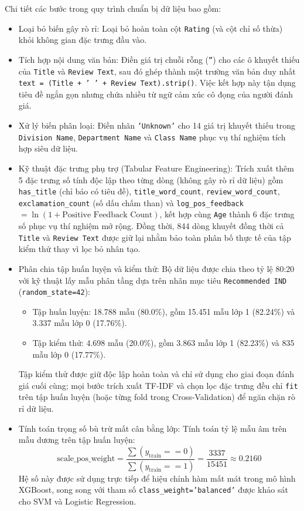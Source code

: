 Chi tiết các bước trong quy trình chuẩn bị dữ liệu bao gồm:
\begin{itemize}
    \item Loại bỏ biến gây rò rỉ: Loại bỏ hoàn toàn cột \texttt{Rating} (và cột chỉ số thừa) khỏi không gian đặc trưng đầu vào.
    \item Tích hợp nội dung văn bản: Điền giá trị chuỗi rỗng (\texttt{''}) cho các ô khuyết thiếu của \texttt{Title} và \texttt{Review Text}, sau đó ghép thành một trường văn bản duy nhất \texttt{text = (Title + ' ' + Review Text).strip()}. Việc kết hợp này tận dụng tiêu đề ngắn gọn nhưng chứa nhiều từ ngữ cảm xúc cô đọng của người đánh giá.
    \item Xử lý biến phân loại: Điền nhãn \texttt{'Unknown'} cho 14 giá trị khuyết thiếu trong \texttt{Division Name}, \texttt{Department Name} và \texttt{Class Name} phục vụ thí nghiệm tích hợp siêu dữ liệu.
    \item Kỹ thuật đặc trưng phụ trợ (Tabular Feature Engineering): Trích xuất thêm 5 đặc trưng số tính độc lập theo từng dòng (không gây rò rỉ dữ liệu) gồm \texttt{has\_title} (chỉ báo có tiêu đề), \texttt{title\_word\_count}, \texttt{review\_word\_count}, \texttt{exclamation\_count} (số dấu chấm than) và \texttt{log\_pos\_feedback} $= \ln(1 + \text{Positive Feedback Count})$, kết hợp cùng \texttt{Age} thành 6 đặc trưng số phục vụ thí nghiệm mở rộng. Đồng thời, 844 dòng khuyết đồng thời cả \texttt{Title} và \texttt{Review Text} được giữ lại nhằm bảo toàn phân bố thực tế của tập kiểm thử thay vì lọc bỏ nhân tạo.
    \item Phân chia tập huấn luyện và kiểm thử: Bộ dữ liệu được chia theo tỷ lệ 80:20 với kỹ thuật lấy mẫu phân tầng dựa trên nhãn mục tiêu \texttt{Recommended IND} (\texttt{random\_state=42}):
    \begin{itemize}
        \item Tập huấn luyện: 18.788 mẫu (80.0\%), gồm 15.451 mẫu lớp 1 (82.24\%) và 3.337 mẫu lớp 0 (17.76\%).
        \item Tập kiểm thử: 4.698 mẫu (20.0\%), gồm 3.863 mẫu lớp 1 (82.23\%) và 835 mẫu lớp 0 (17.77\%).
    \end{itemize}
    Tập kiểm thử được giữ độc lập hoàn toàn và chỉ sử dụng cho giai đoạn đánh giá cuối cùng; mọi bước trích xuất TF-IDF và chọn lọc đặc trưng đều chỉ \texttt{fit} trên tập huấn luyện (hoặc từng fold trong Cross-Validation) để ngăn chặn rò rỉ dữ liệu.
    \item Tính toán trọng số bù trừ mất cân bằng lớp: Tính toán tỷ lệ mẫu âm trên mẫu dương trên tập huấn luyện:
    \begin{equation}
    \text{scale\_pos\_weight} = \frac{\sum (y_{\text{train}} == 0)}{\sum (y_{\text{train}} == 1)} = \frac{3337}{15451} \approx 0.2160
    \end{equation}
    Hệ số này được sử dụng trực tiếp để hiệu chỉnh hàm mất mát trong mô hình XGBoost, song song với tham số \texttt{class\_weight='balanced'} được khảo sát cho SVM và Logistic Regression.
\end{itemize}
